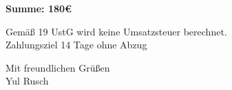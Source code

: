 \documentclass[12pt]{article}
\begin{document}
\vspace{2cm}

\begin{flushleft}

\textbf{Summe: \mbox{\hspace{12.7cm}} 180€}

\vspace{0.2cm}

Gemäß 19 UstG wird keine Umsatzsteuer berechnet.\\
Zahlungsziel 14 Tage ohne Abzug\\

\vspace{0.5cm}

Mit freundlichen Grüßen\\
Yul Rusch

\end{flushleft}
\end{document}
